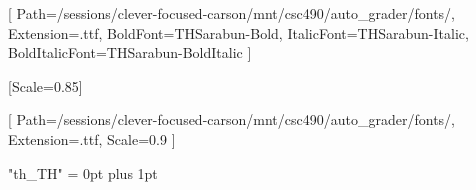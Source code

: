 \usepackage{fontspec}

\setmainfont{THSarabun}[
  Path=/sessions/clever-focused-carson/mnt/csc490/auto_grader/fonts/,
  Extension=.ttf,
  BoldFont=THSarabun-Bold,
  ItalicFont=THSarabun-Italic,
  BoldItalicFont=THSarabun-BoldItalic
]

\setmonofont{DejaVu Sans Mono}[Scale=0.85]

\newfontfamily{}[
  Path=/sessions/clever-focused-carson/mnt/csc490/auto_grader/fonts/,
  Extension=.ttf,
  Scale=0.9
]

\XeTeXlinebreaklocale "th_TH"
\XeTeXlinebreakskip = 0pt plus 1pt

\newfontfamily{}
\usepackage{newunicodechar}

\usepackage{xcolor}
